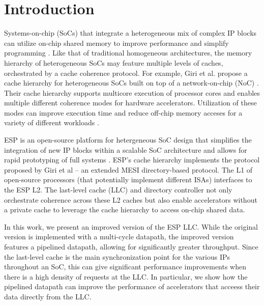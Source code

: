 \section{Introduction}
\label{sec:intro}

Systems-on-chip (SoCs) that integrate a heterogeneous mix of complex IP blocks
can utilize on-chip shared memory to improve performance and simplify
programming \cite{spandex, cohort, li2023duet, mantovani_cases16}.  Like that
of traditional homogeneous architectures, the memory hierarchy of heterogeneous
SoCs may feature multiple levels of caches, orchestrated by a cache coherence
protocol. For example, Giri et al. propose a cache hierarchy for heterogeneous
SoCs built on top of a network-on-chip (NoC) \cite{giri18}.  Their cache
hierarchy supports multicore execution of processor cores and enables multiple
different coherence modes for hardware accelerators.  Utilization of these
modes can improve execution time and reduce off-chip memory acceses for a
variety of different workloads \cite{giri_ieeemicro18, zuckerman_micro21}.

\par ESP is an open-source platform for hetergeneous SoC design that simplifies
the integration of new IP blocks within a scalable SoC architecture and allows
for rapid prototyping of full systems \cite{mantovani_iccad20}. ESP's cache
hierarchy implements the protocol proposed by Giri et al -- an extended MESI
directory-based protocol.  The L1 of open-source processors (that potentially
implement different ISAs) interfaces to the ESP L2. The last-level cache (LLC)
and directory controller not only orchestrate coherence across these L2 caches
but also enable accelerators without a private cache to leverage the cache
hierarchy to access on-chip shared data.

\par In this work, we present an improved version of the ESP LLC. While the
original version is implemented with a multi-cycle datapath, the improved
version features a pipelined datapath, allowing for significantly greater
throughput. Since the last-level cache is the main synchronization point for
the various IPs throughout an SoC, this can give significant performance
improvements when there is a high density of requests at the LLC. In
particular, we show how the pipelined datapath can improve the performance of
accelerators that acceess their data directly from the LLC.
